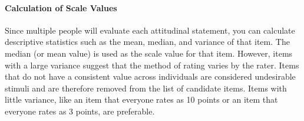 \documentclass{ltjsbook}
\begin{document}
\paragraph{Calculation of Scale Values} Since multiple people will evaluate each attitudinal statement, you can calculate descriptive statistics such as the mean, median, and variance of that item. The median (or mean value) is used as the scale value for that item. However, items with a large variance suggest that the method of rating varies by the rater. Items that do not have a consistent value across individuals are considered undesirable stimuli and are therefore removed from the list of candidate items. Items with little variance, like an item that everyone rates as 10 points or an item that everyone rates as 3 points, are preferable.

\end{document}
